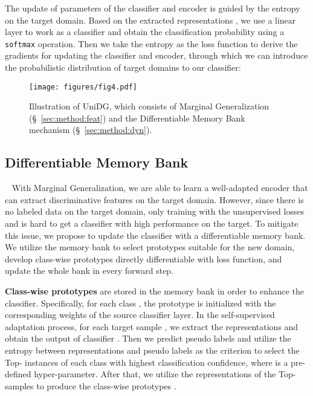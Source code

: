 \documentclass{article} \usepackage{iclr2024_conference,times}
\begin{document}
    The update of parameters of the classifier  and encoder is guided by the entropy on the target domain. Based on the extracted representations , we use a linear layer to work as a classifier and obtain the classification probability  using a \texttt{softmax} operation. Then we take the entropy as the loss function to derive the gradients for updating the classifier and encoder, through which we can introduce the probabilistic distribution of target domains to our classifier: 
        

        \begin{figure}[t]
        \centering
        \texttt{[image: figures/fig4.pdf]}
    \caption{Illustration of UniDG, which consists of Marginal Generalization (\S~\ref{sec:method:feat}) and the Differentiable Memory Bank mechanism (\S~\ref{sec:method:dyn}).}
        \label{fig:framework}
        \vspace{-4mm}
    \end{figure}
   
    \subsection{Differentiable Memory Bank}~\label{sec:method:dyn}
With Marginal Generalization, we are able to learn a well-adapted encoder that can extract discriminative features on the target domain. However, since there is no labeled data on the target domain, only training with the unsupervised losses  and  is hard to get a classifier  with high performance on the target. To mitigate this issue, 
we propose to update the classifier with a differentiable memory bank. We utilize the memory bank to select prototypes suitable for the new domain, develop class-wise prototypes directly differentiable with loss function, and update the whole bank in every forward step.

    \textbf{Class-wise prototypes} are stored in the memory bank in order to enhance the classifier. Specifically, for each class , the prototype  is initialized with the corresponding weights of the source classifier layer. In the self-supervised adaptation process, for each target sample , we extract the representations  and obtain the output of classifier . Then we predict pseudo labels  and utilize the entropy between representations and pseudo labels as the criterion to select the Top- instances of each class with highest classification confidence, where  is a pre-defined hyper-parameter. After that, we utilize the representations of the Top- samples 
    to produce the class-wise prototypes . 
\end{document}
